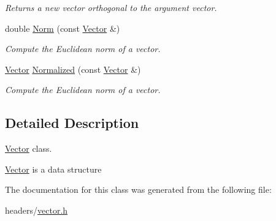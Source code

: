 \begin{DoxyCompactItemize}
\begin{DoxyCompactList}\small\item\em \-Returns a new vector orthogonal to the argument vector. \end{DoxyCompactList}\item 
\hypertarget{class_vector_aafee6c0f5a420bd4f869b62d099222b3}{
double \hyperlink{class_vector_aafee6c0f5a420bd4f869b62d099222b3}{\-Norm} (const \hyperlink{class_vector}{\-Vector} \&)}
\label{class_vector_aafee6c0f5a420bd4f869b62d099222b3}

\begin{DoxyCompactList}\small\item\em \-Compute the \-Euclidean norm of a vector. \end{DoxyCompactList}\item 
\hypertarget{class_vector_a49c314e89f483ee7c68fca2baf9920b1}{
\hyperlink{class_vector}{\-Vector} \hyperlink{class_vector_a49c314e89f483ee7c68fca2baf9920b1}{\-Normalized} (const \hyperlink{class_vector}{\-Vector} \&)}
\label{class_vector_a49c314e89f483ee7c68fca2baf9920b1}

\begin{DoxyCompactList}\small\item\em \-Compute the \-Euclidean norm of a vector. \end{DoxyCompactList}\end{DoxyCompactItemize}


\subsection{\-Detailed \-Description}
\hyperlink{class_vector}{\-Vector} class. 

\hyperlink{class_vector}{\-Vector} is a data structure 

\-The documentation for this class was generated from the following file\-:\begin{DoxyCompactItemize}
\item 
headers/\hyperlink{vector_8h}{vector.\-h}\end{DoxyCompactItemize}
